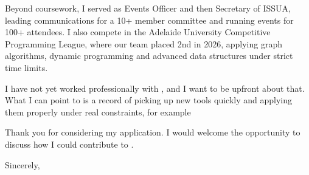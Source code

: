 \documentclass[letterpaper,11pt]{article}
\newcommand{\company}{\todo{Company Name}}
\begin{document}
Beyond coursework, I served as Events Officer and then Secretary of ISSUA, leading communications for a 10+ member committee and running events for 100+ attendees. I also compete in the Adelaide University Competitive Programming League, where our team placed 2nd in 2026, applying graph algorithms, dynamic programming and advanced data structures under strict time limits.

I have not yet worked professionally with , and I want to be upfront about that. What I can point to is a record of picking up new tools quickly and applying them properly under real constraints, for example  

Thank you for considering my application. I would welcome the opportunity to discuss how I could contribute to \company.

\vspace{10pt}

Sincerely, \\
\profileName
\end{document}
